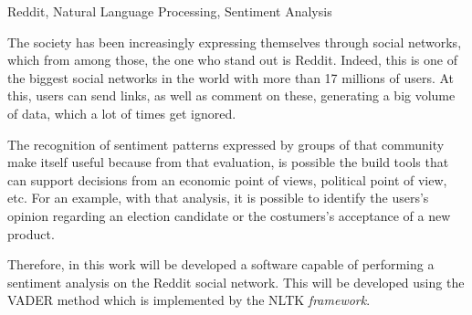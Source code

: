 \documentclass{iiufrgs}
\begin{document}
\begin{englishabstract}{}{Reddit, Natural Language Processing, Sentiment
Analysis}

The society has been increasingly expressing themselves through social networks,
which from among those, the one who stand out is Reddit. Indeed, this is one of
the biggest social networks in the world with more than 17 millions of users. At
this, users can send links, as well as comment on these, generating a big volume
of data, which a lot of times get ignored.

The recognition of sentiment patterns expressed by groups of that community
make itself useful because from that evaluation, is possible the build tools
that can support decisions from an economic point of views, political
point of view, etc. For an example, with that
analysis, it is possible to identify the users's opinion regarding an election candidate or the costumers's acceptance of a new product.

Therefore, in this work will be developed a software capable of performing a
sentiment analysis on the Reddit social network. This will be developed using
the \ac{VADER} method which is implemented by the \ac{NLTK} \textit{framework}.

\end{englishabstract}

\acresetall



%

%
% 
% 
% 




\end{document}

